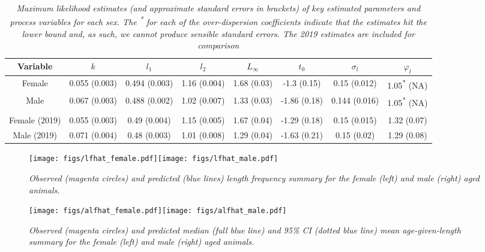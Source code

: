 \documentclass[12pt,a4paper,twoside,times,blue,standard]{csiroreport2017}
\newcommand{\vphi}{\varphi}
\begin{document}
\begin{table}[h]
    {\scriptsize
    \begin{center}
    \begin{tabular}{|c|ccccccc|}
         \hline
          Variable & $k$ & $l_1$ & $l_2$ & $L_{\infty}$ & $t_0$ & $\sigma_l$ & $\vphi_l$\\
          \hline 
          \hline
          Female & 0.055 (0.003) & 0.494 (0.003) & 1.16 (0.004) & 1.68 (0.03) & -1.3 (0.15) & 0.15 (0.012) & 1.05\textsuperscript{*} (NA)\\
          Male & 0.067 (0.003) & 0.488 (0.002) & 1.02 (0.007) & 1.33 (0.03) & -1.86 (0.18) & 0.144 (0.016) & 1.05\textsuperscript{*} (NA)\\
          & & & & & & &\\
          Female (2019) & 0.055 (0.003) & 0.49 (0.004) & 1.15 (0.005) & 1.67 (0.04) & -1.29 (0.18) & 0.15 (0.015) & 1.32 (0.07)\\
          Male (2019) & 0.071 (0.004) & 0.48 (0.003) & 1.01 (0.008) & 1.29 (0.04) & -1.63 (0.21) & 0.15 (0.02) & 1.29 (0.08) \\
          \hline
    \end{tabular}
    \end{center}
    }
    \caption{\textit{Maximum likelihood estimates (and approximate standard errors in brackets) of key estimated parameters and process variables for each sex. The \textsuperscript{*} for each of the over-dispersion coefficients indicate that the estimates hit the lower bound and, as such, we cannot produce sensible standard errors. The 2019 estimates are included for comparison}}
\end{table}

\begin{figure}[h]
    \begin{center}
        \texttt{[image: figs/lfhat\_female.pdf]}\texttt{[image: figs/lfhat\_male.pdf]}
    \end{center}
    \caption{\textit{Observed (magenta circles) and predicted (blue lines) length frequency summary for the female (left) and male (right) aged animals.}}
\end{figure}

\begin{figure}[h]
    \begin{center}
        \texttt{[image: figs/alfhat\_female.pdf]}\texttt{[image: figs/alfhat\_male.pdf]}
    \end{center}
    \caption{\textit{Observed (magenta circles) and predicted median (full blue line) and 95\% CI (dotted blue line) mean age-given-length summary for the female (left) and male (right) aged animals.}}
\end{figure}
\end{document}
